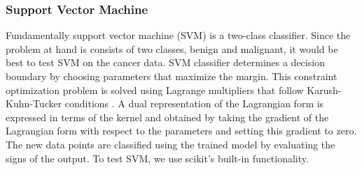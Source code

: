 \subsubsection{Support Vector Machine}\label{subsubsec:SVM}
Fundamentally support vector machine (SVM) is a two-class classifier. Since the problem at hand is consists of two classes, benign and malignant, it would be best to test SVM on the cancer data. SVM classifier determines a decision boundary by choosing parameters that maximize the margin. This constraint optimization problem is solved using Lagrange multipliers that follow Karush-Kuhn-Tucker conditions \cite{bishop2006pattern}. A dual representation of the Lagrangian form is expressed in terms of the kernel and obtained by taking the gradient of the Lagrangian form with respect to the parameters and setting this gradient to zero. The new data points are classified using the trained model by evaluating the signs of the output. To test SVM, we use scikit's built-in functionality. 